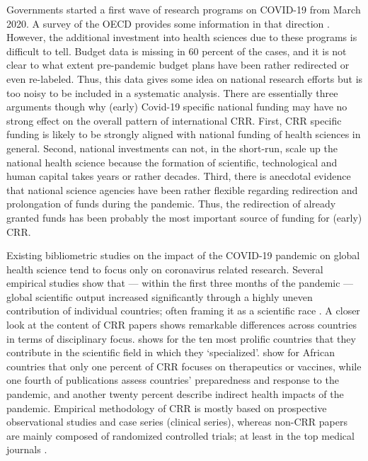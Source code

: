 Governments started a first wave of research programs on COVID-19 from March 2020. A survey of the OECD provides some information in that direction \citep{ECOECD2021}. However, the additional investment into health sciences due to these programs is difficult to tell. Budget data is missing in 60 percent of the cases, and it is not clear to what extent pre-pandemic budget plans have been rather redirected or even re-labeled. Thus, this data gives some idea on national research efforts but is too noisy to be included in a systematic analysis. There are essentially three arguments though why (early) Covid-19 specific national funding may have no strong effect on the overall pattern of international CRR. First, CRR specific funding is likely to be strongly aligned with national funding of health sciences in general. Second, national investments can not, in the short-run, scale up the national health science because the formation of scientific, technological and human capital takes years or rather decades. Third, there is anecdotal evidence that national science agencies have been rather flexible regarding redirection and prolongation of funds during the pandemic. Thus, the redirection of already granted funds has been probably the most important source of funding for (early) CRR.

Existing bibliometric studies on the impact of the COVID-19 pandemic on global health science tend to focus only on coronavirus related research. Several empirical studies show that --- within the first three months of the pandemic --- global scientific output increased significantly through a highly uneven contribution of individual countries; often framing it as a scientific race \citep{aviv2021publication,chahrour2020bibliometric,haghani2020covid,radanliev2020country,zhang2020scientific}. A closer look at the content of CRR papers shows remarkable differences across countries in terms of disciplinary focus. \cite{zhang2020scientific} shows for the ten most prolific countries that they contribute in the scientific field in which they `specialized'. \citet{guleid2021bibliometric} show for African countries that only one percent of CRR focuses on therapeutics or vaccines, while one fourth of publications assess countries' preparedness and response to the pandemic, and another twenty percent describe indirect health impacts of the pandemic. Empirical methodology of CRR is mostly based on prospective observational studies and case series (clinical series), whereas non-CRR papers are mainly composed of randomized controlled trials; at least in the top medical journals \citep[based on 402 papers published in 2019-2020,][]{gai2021general}. 

